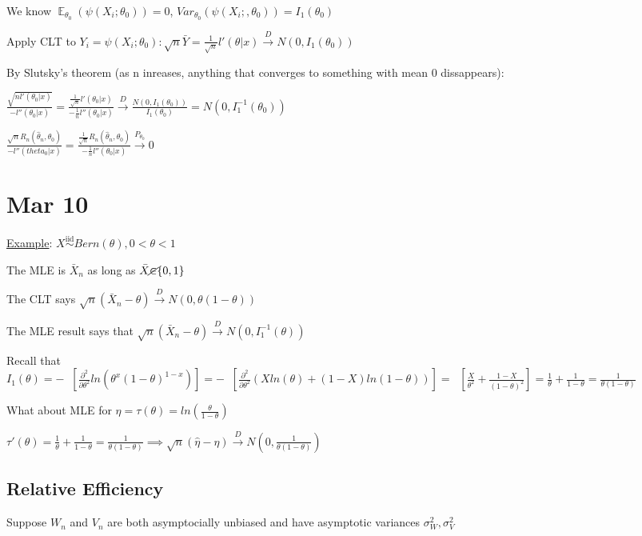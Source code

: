 \documentclass{article}
\DeclareMathOperator{\EX}{\mathbb{E}} %
\DeclareMathOperator{\ext}{\EX_{\theta}} %
\newcommand{\dto}{\overset{D}{\to}}
\newcommand{\iiddist}{\overset{\mathrm{iid}}{\sim}}
\begin{document}
We know $\EX_{\theta_0}(\psi(X_i; \theta_0)) = 0$, $Var_{\theta_0}(\psi(X_i;, \theta_0)) = I_1(\theta_0)$

Apply CLT to $Y_i = \psi(X_i; \theta_0): \sqrt{n}\bar{Y} = \frac{1}{\sqrt{n}}l'(\theta|x) \dto N(0, I_1(\theta_0))$ 

By Slutsky's theorem (as n inreases, anything that converges to something with mean 0 dissappears): 

$\frac{\sqrt{nl'(\theta_0|x)}}{-l''(\theta_0|x)} = \frac{\frac{1}{\sqrt{n}}l'(\theta_0|x)}{-\frac{1}{n}l''(\theta_0|x)} \dto \frac{N(0, I_1(\theta_0))}{I_1(\theta_0)} = N(0, I_1^{-1}(\theta_0))$

$\frac{\sqrt{n}R_n(\hat{\theta}_n, \theta_0)}{-l''(theta_0|x)} = \frac{\frac{1}{\sqrt{n}}R_n(\hat{\theta}_n, \theta_0)}{-\frac{1}{n}l''(\theta_0|x)} \overset{P_{\theta_0}}{\to} 0$

\section{Mar 10}

\underline{Example}: $X \iiddist Bern(\theta), 0 < \theta < 1$

The MLE is $\bar{X}_n$ as long as $\bar{X} \cancel{\in} \{0, 1\}$

The CLT says $\sqrt{n}(\bar{X}_n-\theta) \dto N(0, \theta(1-\theta))$

The MLE result says that $\sqrt{n}(\bar{X}_n-\theta) \dto N(0, I_1^{-1}(\theta))$

Recall that $I_1(\theta) = -\ext[\frac{\partial^2}{\partial \theta^2} ln(\theta^x(1-\theta)^{1-x})] = -\ext[\frac{\partial^2}{\partial\theta^2}(Xln(\theta) + (1-X)ln(1-\theta))] = \ext[\frac{X}{\theta^2} + \frac{1-X}{(1-\theta)^2}] = \frac{1}{\theta} + \frac{1}{1-\theta} = \frac{1}{\theta(1-\theta)}$


What about MLE for $\eta = \tau(\theta) = ln(\frac{\theta}{1-\theta})$

$\tau'(\theta) = \frac{1}{\theta} + \frac{1}{1-\theta} = \frac{1}{\theta(1-\theta)} \implies \sqrt{n}(\hat{\eta} - \eta) \dto N(0, \frac{1}{\theta(1-\theta)})$

\subsection{Relative Efficiency}

Suppose $W_n$ and $V_n$ are both asymptocially unbiased and have asymptotic variances $\sigma^2_W, \sigma^2_V$
\end{document}
